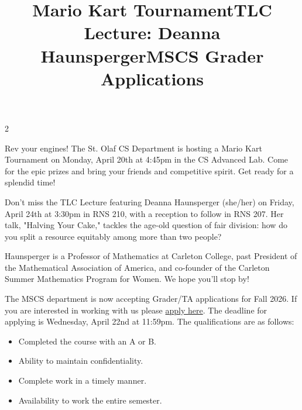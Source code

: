 \documentclass[12pt]{article}
\newcommand{\bolder}{\textbf}
\begin{document}
\begin{multicols}{2}
\begin{tcolorbox}[colback=white, colframe=black]
    \begin{center}
    \title{{\large \bolder{Mario Kart Tournament}}}
    \end{center}
\end{tcolorbox}

Rev your engines! The St. Olaf CS Department is hosting a Mario Kart Tournament on Monday, April 20th at 4:45pm in the CS Advanced Lab. Come for the epic prizes and bring your friends and competitive spirit. Get ready for a splendid time!


\begin{tcolorbox}[colback=white, colframe=black]
    \begin{center}
    \title{{\large \bolder{TLC Lecture: Deanna Haunsperger}}}
    \end{center}
\end{tcolorbox}

Don't miss the TLC Lecture featuring Deanna Haunsperger (she/her) on Friday, April 24th at 3:30pm in RNS 210, with a reception to follow in RNS 207. Her talk, "Halving Your Cake," tackles the age-old question of fair division: how do you split a resource equitably among more than two people? 

Haunsperger is a Professor of Mathematics at Carleton College, past President of the Mathematical Association of America, and co-founder of the Carleton Summer Mathematics Program for Women. We hope you'll stop by!

\begin{tcolorbox}[colback=white, colframe=black]
    \begin{center}
    \title{{\large \bolder{MSCS Grader Applications}}}
    \end{center}
\end{tcolorbox}

The MSCS department is now accepting Grader/TA applications for Fall 2026. If you are interested in working with us please \href{https://forms.gle/c9Rw2DAwuYA8vBtM9}{apply here}. The deadline for applying is Wednesday, April 22nd at 11:59pm. The qualifications are as follows: 

 \begin{itemize}
    \item Completed the course with an A or B.
    \item Ability to maintain confidentiality.
    \item Complete work in a timely manner.
    \item Availability to work the entire semester.
\end{itemize} 


\end{multicols}
\end{document}
